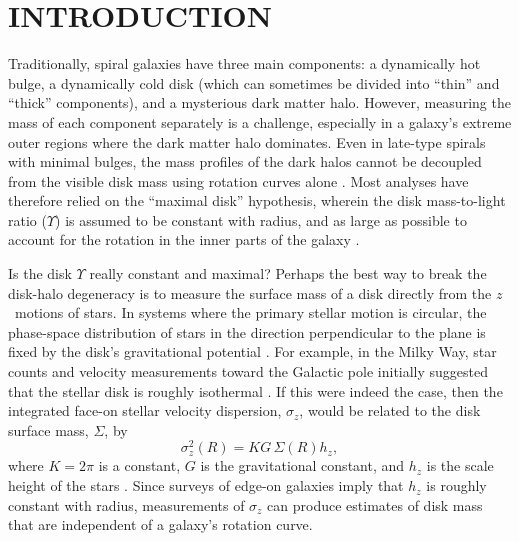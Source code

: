\documentclass[12pt,preprint]{emulateapj}
\newcommand{\eg}{{e.g.,}}
\begin{document}

\section{INTRODUCTION}
Traditionally, spiral galaxies have three main components: a dynamically hot bulge, a dynamically cold disk (which can sometimes be divided into ``thin'' and ``thick'' components), and a mysterious dark matter halo.  However, measuring the mass of each component separately is a challenge, especially in a galaxy's extreme outer regions where the dark matter halo dominates.  Even in late-type spirals with minimal bulges, the mass profiles of the dark halos cannot be decoupled from the visible disk mass using rotation curves alone \citep{bsk04}.  Most analyses have therefore relied on the ``maximal disk'' hypothesis, wherein the disk mass-to-light ratio ($\Upsilon$) is assumed to be constant with radius, and as large as possible to account for the rotation in the inner parts of the galaxy \citep[\eg][]{kent86, pw00, sofue03}.

Is the disk $\Upsilon$ really constant and maximal? Perhaps the best way to break the disk-halo degeneracy is to measure the surface mass of a disk directly from the $z$~motions of stars.  In systems where the primary stellar motion is circular, the phase-space distribution of stars in the direction perpendicular to the plane is fixed by the disk's gravitational potential \citep{bt87}.  For example, in the Milky Way, star counts and velocity measurements toward the Galactic pole initially suggested that the stellar disk is roughly isothermal \citep[\eg][]{oort}.  If this were indeed the case, then the integrated face-on stellar velocity dispersion, $\sigma_z$, would be related to the disk surface mass, $\Sigma$, by
\begin{equation}
\sigma_z^2(R) = K G \, \Sigma(R) h_z,
\label{isothermal}
\end{equation}
where $K = 2 \pi$ is a constant, $G$ is the gravitational constant, and  $h_z$ is the scale height of the stars \citep{vdK88}.   Since surveys of edge-on galaxies \citep[\eg][]{vdKs82, bm02} imply that $h_z$ is roughly constant with radius, measurements of $\sigma_z$ can produce estimates of disk mass that are independent of a galaxy's rotation curve.
\end{document}
